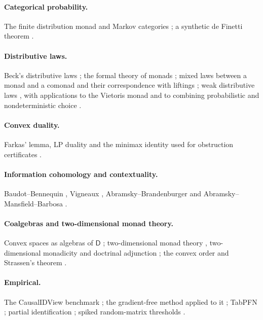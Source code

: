 \documentclass[11pt]{article}
\theoremstyle{definition}
\theoremstyle{remark}
\newcommand{\D}{\mathsf{D}}
\begin{document}
\paragraph{Categorical probability.} The finite distribution monad and Markov categories
\cite{Fritz2020,FGPR2023}; a synthetic de Finetti theorem \cite{FGP2021}.
\paragraph{Distributive laws.} Beck's distributive laws \cite{Beck1969}; the formal theory of monads
\cite{Street1972}; mixed laws between a monad and a comonad and their correspondence with liftings
\cite{PowerWatanabe2002}; weak distributive
laws \cite{Street2009,Bohm2010,BohmLackStreet2011}, with applications to the Vietoris monad
\cite{Garner2020} and to combining probabilistic and nondeterministic choice \cite{GoyPetrisan2020}.
\paragraph{Convex duality.} Farkas' lemma, LP duality and the minimax identity used for
obstruction certificates \cite{Schrijver1986}.
\paragraph{Information cohomology and contextuality.} Baudot--Bennequin \cite{BaudotBennequin2015},
Vigneaux \cite{Vigneaux2019}, Abramsky--Brandenburger \cite{AbramskyBrandenburger2011} and
Abramsky--Mansfield--Barbosa \cite{AbramskyMansfieldBarbosa2012}.
\paragraph{Coalgebras and two-dimensional monad theory.} Convex spaces as algebras of $\D$
\cite{Fritz2009}; two-dimensional monad theory \cite{BKP1989,Lack2002}, two-dimensional monadicity
\cite{Bourke2014} and doctrinal adjunction \cite{Kelly1974}; the convex order and Strassen's theorem
\cite{Strassen1965}.
\paragraph{Empirical.} The CausalIDView benchmark \cite{Jung2026}; the gradient-free method applied
to it \cite[Section~51]{Awasthi-ThreeLayers}; TabPFN \cite{Hollmann2023}; partial
identification \cite{Manski1990}; spiked random-matrix thresholds \cite{BBP2005}.

\end{document}
